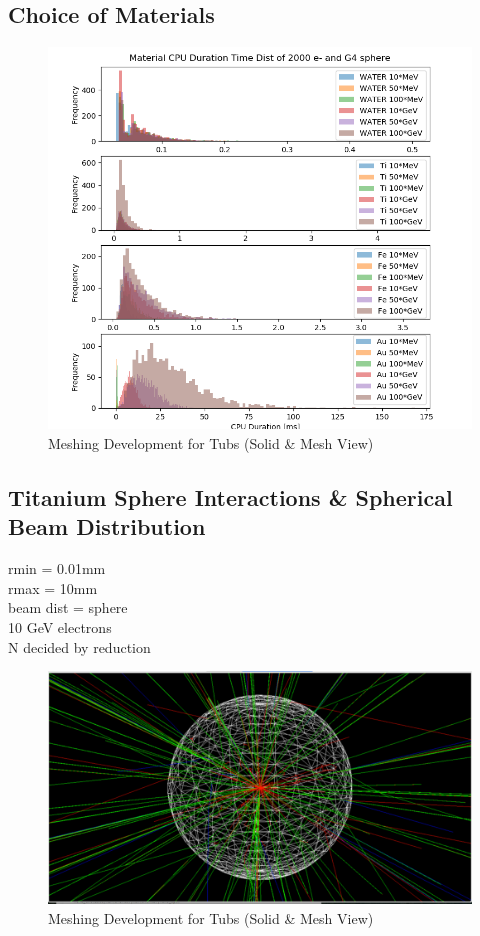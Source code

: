 \documentclass[12pt,a4paper]{article}
\begin{document}
\subsection{Choice of Materials}
\begin{figure}[h!]
\centering
\includegraphics[scale=0.9]{Images//Materials//Materials_Time_dists.png}
\caption[width=\columnwidth]{Meshing Development for Tubs (Solid \& Mesh View)}
\label{tubspic}
\end{figure}


\subsection{Titanium Sphere Interactions \& Spherical Beam Distribution}
rmin = 0.01mm\\
rmax = 10mm\\
beam dist = sphere\\
10 GeV electrons\\
N decided by reduction\\

\begin{figure}[h!]
\centering
\includegraphics[scale=0.33]{Images//BDSIM//titanium.pdf}
\caption[width=\columnwidth]{Meshing Development for Tubs (Solid \& Mesh View)}
\label{tubspic}
\end{figure}
\end{document}

